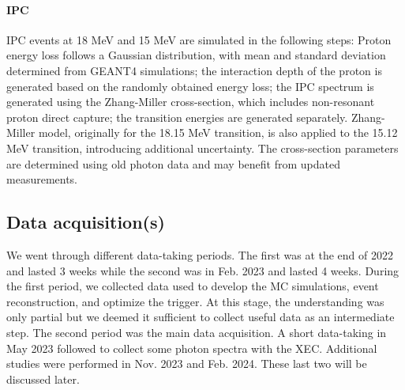 \begin{refsection}
        \paragraph{IPC}
        IPC events at 18 MeV and 15 MeV are simulated in the following steps: Proton energy loss follows a Gaussian distribution, with mean and standard deviation determined from GEANT4 simulations; 
        the interaction depth of the proton is generated based on the randomly obtained energy loss;
        the IPC spectrum is generated using the Zhang-Miller cross-section, which includes non-resonant proton direct capture;
        the transition energies are generated separately. Zhang-Miller model, originally for the 18.15 MeV transition, is also applied to the 15.12 MeV transition, introducing additional uncertainty. The cross-section parameters are determined using old photon data and may benefit from updated measurements.
    
    \subsection{Data acquisition(s)}
        We went through different data-taking periods. 
        The first was at the end of 2022 and lasted 3 weeks while the second was in Feb. 2023 and lasted 4 weeks.
        During the first period, we collected data used to develop the MC simulations, event reconstruction, and optimize the trigger.
        At this stage, the understanding was only partial but we deemed it sufficient to collect useful data as an intermediate step.
        The second period was the main data acquisition. 
        A short data-taking in May 2023 followed to collect some photon spectra with the XEC.
        Additional studies were performed in Nov. 2023 and Feb. 2024.
        These last two will be discussed later.
    

\end{refsection}
